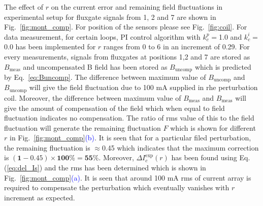 
The effect of $r$ on the current error and remaining field fluctuations in experimental setup for fluxgate signals from 1, 2 and 7 are shown in Fig.~\ref{fig:mont_comp}. For position of the sensors please see Fig.~\ref{fig:coil}. For data measurement, for certain loops, PI control algorithm with $k_c^p=$1.0 and $k_c^i=$0.0 has been implemented for $r$ ranges from 0 to 6 in an increment of 0.29. For every measurements, signals from fluxgates at positions 1,2 and 7 are stored as $B_{\text{meas}}$ and uncompensated B field has been stored as $B_{\text{uncomp}}$ which is predicted by Eq.~\ref{eq:Buncomp}. The difference between maximum value of $B_{\text{uncomp}}$ and $B_{\text{uncomp}}$ will give the field fluctuation due to 100 mA supplied in rhe perturbation coil. Moreover, the difference between maximum value of $B_{\text{meas}}$ and $B_{\text{meas}}$ will give the amount of compensation of the field which when equal to field fluctuation indicates no compensation. The ratio of rms value of this to the field fluctuation will generate the remaining fluctuation $F$ which is shown for different $r$ in Fig.~\ref{fig:mont_comp}\textcolor{blue}{(b)}. It is seen that for a particular filed perturbation, the remaining fluctuation is $\approx$0.45 which indicates that the maximum correction is $\mathbf{(1-0.45)\times100\%=55\%}$. Moreover, $\Delta I_c^{\text{exp}}(r)$ has been found using Eq.(\ref{eq:del_Is}) and the rms has been determined which is shown in  Fig.~\ref{fig:mont_comp}\textcolor{blue}{(a)}. It is seen that around 100 mA rms of current array is required to compensate the perturbation which eventually vanishes with $r$ increment as expected.


